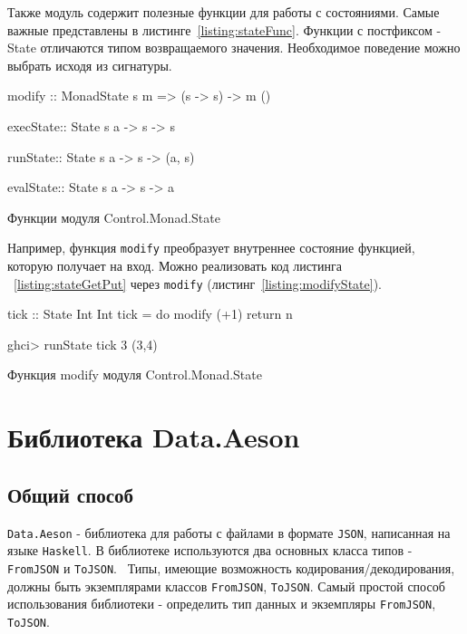 Также модуль содержит полезные функции для работы с состояниями. Самые важные представлены в листинге~\ref{listing:stateFunc}. Функции с постфиксом -State отличаются типом возвращаемого значения. Необходимое поведение можно выбрать исходя из сигнатуры.

\begin{ListingEnv}[H]
\begin{Verb}
modify :: MonadState s m => (s -> s) -> m ()

execState:: State s a -> s -> s

runState:: State s a -> s -> (a, s)

evalState:: State s a -> s -> a
\end{Verb}
\caption{Функции модуля Control.Monad.State}
\label{listing:stateFunc}
\end{ListingEnv}

Например, функция \lstinline{modify} преобразует внутреннее состояние функцией, которую получает на вход. Можно реализовать код листинга ~\ref{listing:stateGetPut} через \lstinline{modify} (листинг~\ref{listing:modifyState}).

\begin{ListingEnv}[H]
\begin{Verb}
tick :: State Int Int
tick = do modify (+1)
          return n

ghci> runState tick 3
(3,4)
\end{Verb}
\caption{Функция modify модуля Control.Monad.State}
\label{listing:modifyState}
\end{ListingEnv}
	
\section{Библиотека Data.Aeson}

\subsection{Общий способ}

\lstinline{Data.Aeson} - библиотека для работы с файлами в формате \lstinline{JSON}, написанная на языке \lstinline{Haskell}. В библиотеке используются два основных класса типов - \lstinline{FromJSON} и \lstinline{ToJSON}.~\cite{aesonEx} Типы, имеющие возможность кодирования/декодирования, должны быть экземплярами классов \lstinline{FromJSON}, \lstinline{ToJSON}. Самый простой способ использования библиотеки - определить тип данных и экземпляры \lstinline{FromJSON}, \lstinline{ToJSON}. 

